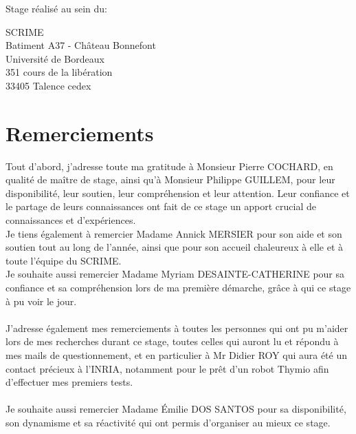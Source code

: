 \documentclass[a4paper, 12pt]{report}
\begin{document}
\begin{titlepage}
\vspace{1cm}
Stage réalisé au sein du:
\begin{multicols}{2}
\begin{center}
SCRIME\\
Batiment A37 - Château Bonnefont\\
Université de Bordeaux\\
351 cours de la libération\\
33405 Talence cedex
\end{center}
\columnbreak
\begin{center}

\vspace{0.4cm}
\end{center}
\end{multicols}



\end{titlepage}


\chapter*{Remerciements}

Tout d'abord, j'adresse toute ma gratitude à Monsieur Pierre COCHARD, en qualité de maître de stage, ainsi qu'à Monsieur Philippe GUILLEM, pour leur disponibilité, leur soutien, leur compréhension et leur attention. Leur confiance et le partage de leurs connaissances ont fait de ce stage un apport crucial de connaissances et d'expériences.\\

Je tiens également à remercier Madame Annick MERSIER pour son aide et son soutien tout au long de l'année, ainsi que pour son accueil chaleureux à elle et à toute l'équipe du SCRIME.\\
Je souhaite aussi remercier Madame Myriam DESAINTE-CATHERINE pour sa confiance et sa compréhension lors de ma première démarche, grâce à qui ce stage à pu voir le jour.\\\\
J'adresse également mes remerciements à toutes les personnes qui ont pu m'aider lors de mes recherches durant ce stage, toutes celles qui auront lu et répondu à mes mails de questionnement, et en particulier à Mr Didier ROY qui aura été un contact précieux à l'INRIA, notamment pour le prêt d'un robot Thymio afin d'effectuer mes premiers tests.\\\\
Je souhaite aussi remercier Madame Émilie DOS SANTOS pour sa disponibilité, son dynamisme et sa réactivité qui ont permis d'organiser au mieux ce stage.\\
\end{document}

